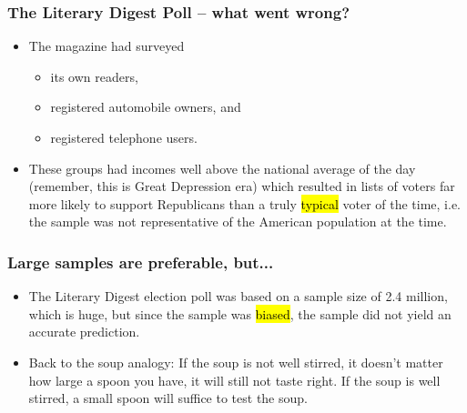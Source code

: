 \documentclass[slidestop,compress,mathserif]{beamer}
\begin{document}
\begin{frame}
\frametitle{The Literary Digest Poll -- what went wrong?}

\begin{itemize}

\item The magazine had surveyed

\begin{itemize}

\item its own readers,

\item registered automobile owners, and

\item registered telephone users.

\end{itemize}

\item These groups had incomes well above the national average of the day (remember, this is Great Depression era) which resulted in lists of voters far more likely to support Republicans than a truly \hl{typical} voter of the time, i.e. the sample was not representative of the American population at the time.

\end{itemize}

\end{frame}


\begin{frame}
\frametitle{Large samples are preferable, but...}

\begin{itemize}

\item The Literary Digest election poll was based on a sample size of 2.4 million, which is huge, but since the sample was \hl{biased}, the sample did not yield an accurate prediction.

\item Back to the soup analogy: If the soup is not well stirred, it doesn't matter how large a spoon you have, it will still not taste right. If the soup is well stirred, a small spoon will suffice to test the soup.

\end{itemize}

\end{frame}

\end{document}
